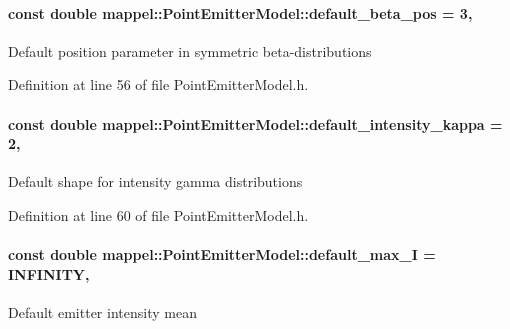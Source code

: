 \paragraph[{\texorpdfstring{default\+\_\+beta\+\_\+pos}{default_beta_pos}}]{\setlength{\rightskip}{0pt plus 5cm}const double mappel\+::\+Point\+Emitter\+Model\+::default\+\_\+beta\+\_\+pos = 3\hspace{0.3cm}{\ttfamily [static]}, {\ttfamily [inherited]}}\hypertarget{classmappel_1_1PointEmitterModel_a9b64c3b4b97ac2805340c0779c71398c}{}\label{classmappel_1_1PointEmitterModel_a9b64c3b4b97ac2805340c0779c71398c}
Default position parameter in symmetric beta-\/distributions 

Definition at line 56 of file Point\+Emitter\+Model.\+h.

\paragraph[{\texorpdfstring{default\+\_\+intensity\+\_\+kappa}{default_intensity_kappa}}]{\setlength{\rightskip}{0pt plus 5cm}const double mappel\+::\+Point\+Emitter\+Model\+::default\+\_\+intensity\+\_\+kappa = 2\hspace{0.3cm}{\ttfamily [static]}, {\ttfamily [inherited]}}\hypertarget{classmappel_1_1PointEmitterModel_ad1f21ed3be543deed3c78a0494cb2984}{}\label{classmappel_1_1PointEmitterModel_ad1f21ed3be543deed3c78a0494cb2984}
Default shape for intensity gamma distributions 

Definition at line 60 of file Point\+Emitter\+Model.\+h.

\paragraph[{\texorpdfstring{default\+\_\+max\+\_\+I}{default_max_I}}]{\setlength{\rightskip}{0pt plus 5cm}const double mappel\+::\+Point\+Emitter\+Model\+::default\+\_\+max\+\_\+I = I\+N\+F\+I\+N\+I\+TY\hspace{0.3cm}{\ttfamily [static]}, {\ttfamily [inherited]}}\hypertarget{classmappel_1_1PointEmitterModel_acca80757a9a285a9e6eedea167d038c7}{}\label{classmappel_1_1PointEmitterModel_acca80757a9a285a9e6eedea167d038c7}
Default emitter intensity mean 

